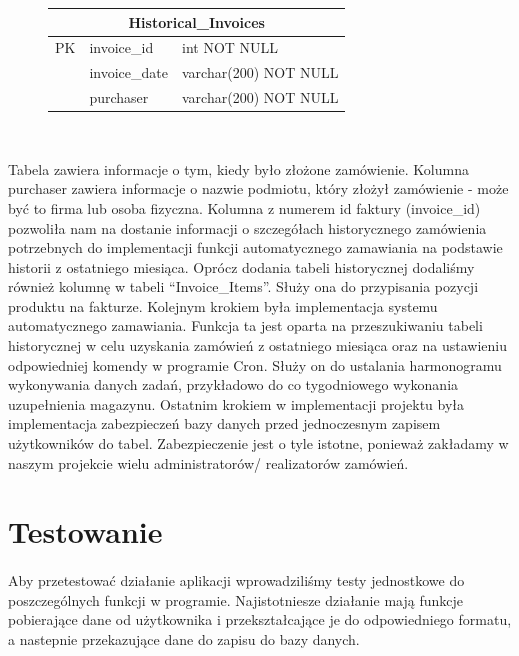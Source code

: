\documentclass{article}
\begin{document}
\begin{figure}[H]
   \centering
   \begin{tabular}{|c|l|l|} \hline
      \multicolumn{3}{|c|}{Historical\_Invoices} \\ \hline
      PK & invoice\_id   & int NOT NULL          \\ \hline
         & invoice\_date & varchar(200) NOT NULL \\
         & purchaser     & varchar(200) NOT NULL \\ \hline
   \end{tabular} \\
\end{figure}
\vspace{0.3cm}
Tabela zawiera informacje o tym, kiedy było złożone zamówienie.
Kolumna purchaser zawiera informacje o nazwie podmiotu, który złożył zamówienie
- może być to firma lub osoba fizyczna. Kolumna z numerem id faktury (invoice\_id) pozwoliła nam na
dostanie informacji o szczegółach historycznego zamówienia potrzebnych do implementacji funkcji
automatycznego zamawiania na podstawie historii z ostatniego miesiąca. Oprócz dodania tabeli
historycznej dodaliśmy również kolumnę w tabeli ``Invoice\_Items''. Służy ona do przypisania pozycji
produktu na fakturze. Kolejnym krokiem była implementacja systemu automatycznego zamawiania. Funkcja ta jest oparta na przeszukiwaniu tabeli
historycznej w celu uzyskania zamówień z ostatniego miesiąca oraz na ustawieniu odpowiedniej komendy
w programie Cron. Służy on do ustalania harmonogramu wykonywania danych zadań, przykładowo do
co tygodniowego wykonania uzupełnienia magazynu. Ostatnim krokiem w implementacji projektu była
implementacja zabezpieczeń bazy danych przed jednoczesnym zapisem użytkowników do tabel.
Zabezpieczenie jest o tyle istotne, ponieważ zakładamy w naszym projekcie wielu administratorów/
realizatorów zamówień.

\section{Testowanie}
\paragraph{}
Aby przetestować działanie aplikacji wprowadziliśmy testy jednostkowe do poszczególnych funkcji w
programie.
Najistotniesze działanie mają funkcje pobierające dane od użytkownika i przekształcające je do
odpowiedniego formatu, a nastepnie przekazujące dane do zapisu do bazy danych.
\end{document}
